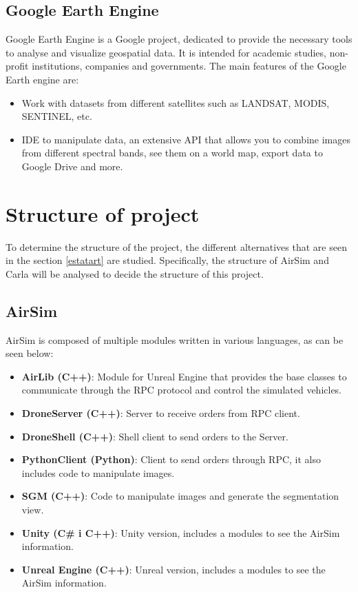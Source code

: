 \documentclass[10pt,a4paper,twocolumn,twoside]{article}
\begin{document}
\subsection{Google Earth Engine}

Google Earth Engine is a Google project, dedicated to provide the necessary tools to analyse and visualize geospatial data. It is intended for academic studies, non-profit institutions, companies and governments. The main features of the Google Earth engine are:

\begin{itemize}
\setlength\itemsep{0em}
  \item Work with datasets from different satellites such as LANDSAT, MODIS, SENTINEL, etc.
  \item IDE to manipulate data, an extensive API that allows you to combine images from different spectral bands, see them on a world map, export data to Google Drive and more.
\end{itemize}

\section{Structure of project}
To determine the structure of the project, the different alternatives that are seen in the section \ref{estatart} are studied. Specifically, the structure of AirSim and Carla will be analysed to decide the structure of this project.

\subsection{AirSim} 
AirSim is composed of multiple modules written in various languages, as can be seen below:

\begin{itemize}
\setlength\itemsep{0em}
	\item \textbf{AirLib (C++)}: Module for Unreal Engine that provides the base classes to communicate through the RPC protocol and control the simulated vehicles.
	\item \textbf{DroneServer (C++)}: Server to receive orders from RPC client.
  	\item \textbf{DroneShell (C++)}: Shell client to send orders to the Server.
  	\item \textbf{PythonClient (Python)}: Client to send orders through RPC, it also includes code to manipulate images.
  	\item \textbf{SGM (C++)}: Code to manipulate images and generate the segmentation view.
    \item \textbf{Unity (C\# i C++)}: Unity version, includes a modules to see the AirSim information.
    \item \textbf{Unreal Engine (C++)}: Unreal version, includes a modules to see the AirSim information.
\end{itemize}
\end{document}

